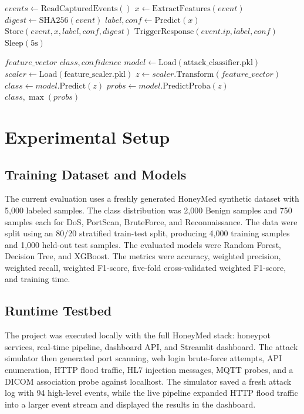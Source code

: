 \documentclass[conference, a4paper]{IEEEtran}
\begin{document}
\begin{algorithm}[!t]
\caption{Real-time evidence pipeline}\label{alg:pipeline}
\begin{algorithmic}[1]
    \State $events \gets \text{ReadCapturedEvents}()$
        \State $x \gets \text{ExtractFeatures}(event)$
        \State $digest \gets \text{SHA256}(event)$
        \State $label, conf \gets \text{Predict}(x)$
        \State $\text{Store}(event, x, label, conf, digest)$
            \State $\text{TriggerResponse}(event.ip, label, conf)$
        \EndIf
    \EndFor
    \State $\text{Sleep}(5\text{s})$
\EndWhile
\end{algorithmic}
\end{algorithm}

\begin{algorithm}[!t]
\caption{ML inference predictor}\label{alg:predict}
\begin{algorithmic}[1]
\Require $feature\_vector$
\Ensure $class, confidence$
\State $model \gets \text{Load}(\text{attack\_classifier.pkl})$
\State $scaler \gets \text{Load}(\text{feature\_scaler.pkl})$
\State $z \gets scaler.\text{Transform}(feature\_vector)$
\State $class \gets model.\text{Predict}(z)$
\State $probs \gets model.\text{PredictProba}(z)$
\State \Return $class, \max(probs)$
\end{algorithmic}
\end{algorithm}

\section{Experimental Setup}

\subsection{Training Dataset and Models}
The current evaluation uses a freshly generated HoneyMed synthetic dataset with 5,000 labeled samples. The class distribution was 2,000 Benign samples and 750 samples each for DoS, PortScan, BruteForce, and Reconnaissance. The data were split using an 80/20 stratified train-test split, producing 4,000 training samples and 1,000 held-out test samples. The evaluated models were Random Forest, Decision Tree, and XGBoost. The metrics were accuracy, weighted precision, weighted recall, weighted F1-score, five-fold cross-validated weighted F1-score, and training time.

\subsection{Runtime Testbed}
The project was executed locally with the full HoneyMed stack: honeypot services, real-time pipeline, dashboard API, and Streamlit dashboard. The attack simulator then generated port scanning, web login brute-force attempts, API enumeration, HTTP flood traffic, HL7 injection messages, MQTT probes, and a DICOM association probe against localhost. The simulator saved a fresh attack log with 94 high-level events, while the live pipeline expanded HTTP flood traffic into a larger event stream and displayed the results in the dashboard.
\end{document}
